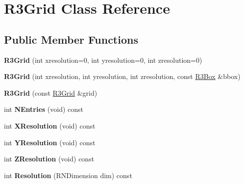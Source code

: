 \hypertarget{class_r3_grid}{}\section{R3\+Grid Class Reference}
\label{class_r3_grid}
\subsection*{Public Member Functions}
\begin{DoxyCompactItemize}
\item 
{\bfseries R3\+Grid} (int xresolution=0, int yresolution=0, int zresolution=0)\hypertarget{class_r3_grid_a263b696638a1862f4bd0c58b41acd348}{}\label{class_r3_grid_a263b696638a1862f4bd0c58b41acd348}

\item 
{\bfseries R3\+Grid} (int xresolution, int yresolution, int zresolution, const \hyperlink{class_r3_box}{R3\+Box} \&bbox)\hypertarget{class_r3_grid_a45805d701919185e394bad166f5a3819}{}\label{class_r3_grid_a45805d701919185e394bad166f5a3819}

\item 
{\bfseries R3\+Grid} (const \hyperlink{class_r3_grid}{R3\+Grid} \&grid)\hypertarget{class_r3_grid_a50260941a5e1fa98f4bf97fc5eb7ca81}{}\label{class_r3_grid_a50260941a5e1fa98f4bf97fc5eb7ca81}

\item 
int {\bfseries N\+Entries} (void) const \hypertarget{class_r3_grid_a660610b234dd833dcd77e42ec2dab6d2}{}\label{class_r3_grid_a660610b234dd833dcd77e42ec2dab6d2}

\item 
int {\bfseries X\+Resolution} (void) const \hypertarget{class_r3_grid_ab78e0abfd74d78ba3588ab213ef77b93}{}\label{class_r3_grid_ab78e0abfd74d78ba3588ab213ef77b93}

\item 
int {\bfseries Y\+Resolution} (void) const \hypertarget{class_r3_grid_a15520d5de7cc5bdfc598fd49c0a14da9}{}\label{class_r3_grid_a15520d5de7cc5bdfc598fd49c0a14da9}

\item 
int {\bfseries Z\+Resolution} (void) const \hypertarget{class_r3_grid_a71e26a27a5a211d9c6bf15534f10234a}{}\label{class_r3_grid_a71e26a27a5a211d9c6bf15534f10234a}

\item 
int {\bfseries Resolution} (R\+N\+Dimension dim) const \hypertarget{class_r3_grid_a0d2f24715ad10008e18b303471237c44}{}\label{class_r3_grid_a0d2f24715ad10008e18b303471237c44}


\end{DoxyCompactItemize}
